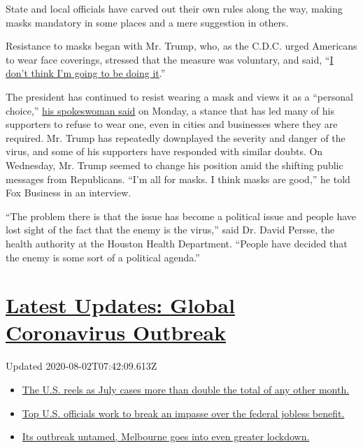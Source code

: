 State and local officials have carved out their own rules along the way,
making masks mandatory in some places and a mere suggestion in others.

Resistance to masks began with Mr. Trump, who, as the C.D.C. urged
Americans to wear face coverings, stressed that the measure was
voluntary, and said,
``\href{https://www.nytimes.com/video/us/politics/100000007070943/trump-mask-coronavirus.html}{I
don't think I'm going to be doing it}.''

The president has continued to resist wearing a mask and views it as a
``personal choice,''
\href{https://abcnews.go.com/Politics/mandatory-mask-rulestrump-insists-personal-choice/story?id=71519019}{his
spokeswoman said} on Monday, a stance that has led many of his
supporters to refuse to wear one, even in cities and businesses where
they are required. Mr. Trump has repeatedly downplayed the severity and
danger of the virus, and some of his supporters have responded with
similar doubts. On Wednesday, Mr. Trump seemed to change his position
amid the shifting public messages from Republicans. ``I'm all for masks.
I think masks are good,'' he told Fox Business in an interview.

``The problem there is that the issue has become a political issue and
people have lost sight of the fact that the enemy is the virus,'' said
Dr. David Persse, the health authority at the Houston Health Department.
``People have decided that the enemy is some sort of a political
agenda.''

\hypertarget{latest-updates-global-coronavirus-outbreak}{%
\section{\texorpdfstring{\href{https://www.nytimes.com/2020/08/01/world/coronavirus-covid-19.html?action=click\&pgtype=Article\&state=default\&region=MAIN_CONTENT_1\&context=storylines_live_updates}{Latest
Updates: Global Coronavirus
Outbreak}}{Latest Updates: Global Coronavirus Outbreak}}\label{latest-updates-global-coronavirus-outbreak}}

Updated 2020-08-02T07:42:09.613Z

\begin{itemize}
\tightlist
\item
  \href{https://www.nytimes.com/2020/08/01/world/coronavirus-covid-19.html?action=click\&pgtype=Article\&state=default\&region=MAIN_CONTENT_1\&context=storylines_live_updates\#link-34047410}{The
  U.S. reels as July cases more than double the total of any other
  month.}
\item
  \href{https://www.nytimes.com/2020/08/01/world/coronavirus-covid-19.html?action=click\&pgtype=Article\&state=default\&region=MAIN_CONTENT_1\&context=storylines_live_updates\#link-780ec966}{Top
  U.S. officials work to break an impasse over the federal jobless
  benefit.}
\item
  \href{https://www.nytimes.com/2020/08/01/world/coronavirus-covid-19.html?action=click\&pgtype=Article\&state=default\&region=MAIN_CONTENT_1\&context=storylines_live_updates\#link-2bc8948}{Its
  outbreak untamed, Melbourne goes into even greater lockdown.}
\end{itemize}

